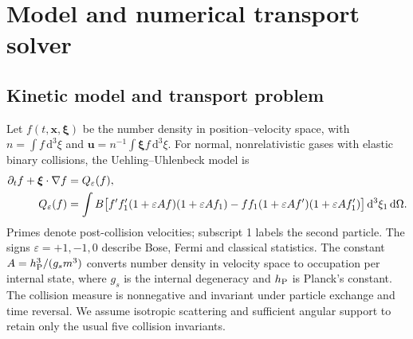 \section{Model and numerical transport solver}
\label{qt:computation}

\subsection{Kinetic model and transport problem}
Let $f(t,\mathbf x,\boldsymbol\xi)$ be the number density in position--velocity
space, with $n=\int f\,\mathrm d^3\xi$ and
$\mathbf u=n^{-1}\int\boldsymbol\xi f\,\mathrm d^3\xi$.
For normal, nonrelativistic gases with elastic binary collisions, the
Uehling--Uhlenbeck model \cite{qtUU} is
\begin{align}
 \partial_t f+\boldsymbol\xi\cdot\nabla f&=Q_\varepsilon(f),\notag\\
 Q_\varepsilon(f)&=\int B\bigl[
 f'f_1'(1+\varepsilon Af)(1+\varepsilon Af_1)
 -ff_1(1+\varepsilon Af')(1+\varepsilon Af_1')\bigr]
 \,\mathrm d^3\xi_1\,\mathrm d\Omega.
 \label{qt:uu}
\end{align}
Primes denote post-collision velocities; subscript 1 labels the second
particle. The signs $\varepsilon=+1,-1,0$ describe Bose, Fermi and classical
statistics. The constant $A=h_{\rm P}^3/(g_s m^3)$ converts number density
in velocity space to occupation per internal state, where $g_s$ is the
internal degeneracy and $h_{\rm P}$ is Planck's constant.
The collision measure is nonnegative and invariant under particle exchange
and time reversal. We assume isotropic scattering and sufficient angular
support to retain only the usual five collision invariants.

